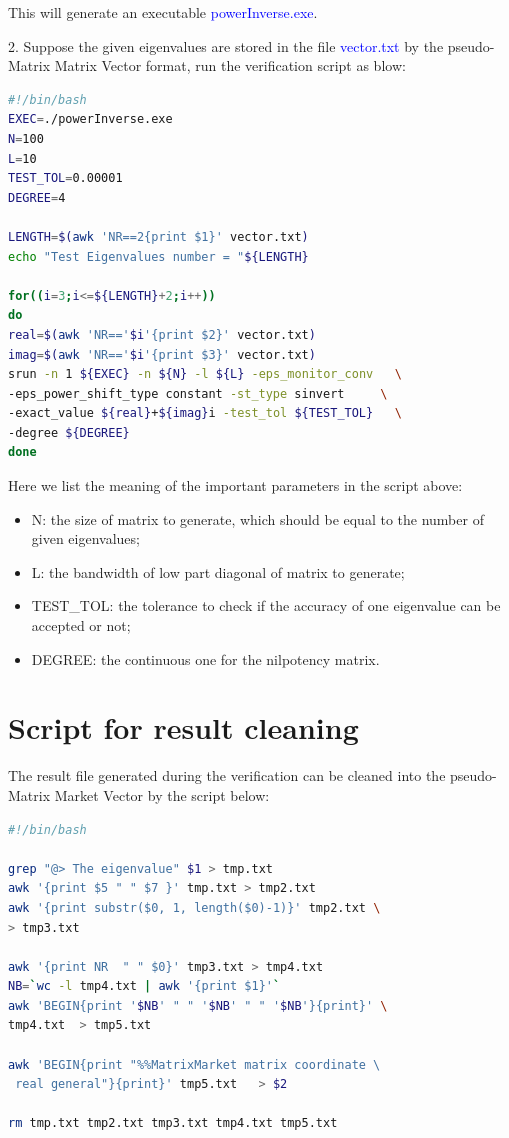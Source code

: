 \documentclass[a4paper, 10 pt]{report}
\begin{document}
	This will generate an executable  \textcolor{blue}{powerInverse.exe}.
	
	2. Suppose the given eigenvalues are stored in the file \textcolor{blue}{vector.txt} by the pseudo-Matrix Matrix Vector format, run the verification script as blow:
		\begin{lstlisting}[language=bash,frame=single]
#!/bin/bash
EXEC=./powerInverse.exe
N=100
L=10
TEST_TOL=0.00001
DEGREE=4

LENGTH=$(awk 'NR==2{print $1}' vector.txt)
echo "Test Eigenvalues number = "${LENGTH}

for((i=3;i<=${LENGTH}+2;i++))
do
real=$(awk 'NR=='$i'{print $2}' vector.txt)
imag=$(awk 'NR=='$i'{print $3}' vector.txt)
srun -n 1 ${EXEC} -n ${N} -l ${L} -eps_monitor_conv   \
-eps_power_shift_type constant -st_type sinvert     \
-exact_value ${real}+${imag}i -test_tol ${TEST_TOL}   \
-degree ${DEGREE}
done

   \end{lstlisting}

	Here we list the meaning of the important parameters in the script above:
	
	\begin{itemize}
		\item N: the size of matrix to generate, which should be equal to the number of given eigenvalues;
		\item L: the bandwidth of low part diagonal of matrix to generate;
		\item TEST\_TOL: the tolerance to check if the accuracy of one eigenvalue can be accepted or not;
		\item DEGREE: the continuous one for the nilpotency matrix.
	\end{itemize}
	\section{Script for result cleaning}
	
	The result file generated during the verification can be cleaned into the pseudo-Matrix Market Vector by the script below:
	
	\begin{lstlisting}[language=bash,frame=single]
#!/bin/bash

grep "@> The eigenvalue" $1 > tmp.txt
awk '{print $5 " " $7 }' tmp.txt > tmp2.txt
awk '{print substr($0, 1, length($0)-1)}' tmp2.txt \
> tmp3.txt

awk '{print NR  " " $0}' tmp3.txt > tmp4.txt
NB=`wc -l tmp4.txt | awk '{print $1}'`
awk 'BEGIN{print '$NB' " " '$NB' " " '$NB'}{print}' \
tmp4.txt  > tmp5.txt

awk 'BEGIN{print "%%MatrixMarket matrix coordinate \
 real general"}{print}' tmp5.txt   > $2

rm tmp.txt tmp2.txt tmp3.txt tmp4.txt tmp5.txt
   \end{lstlisting}
		
\end{document}

